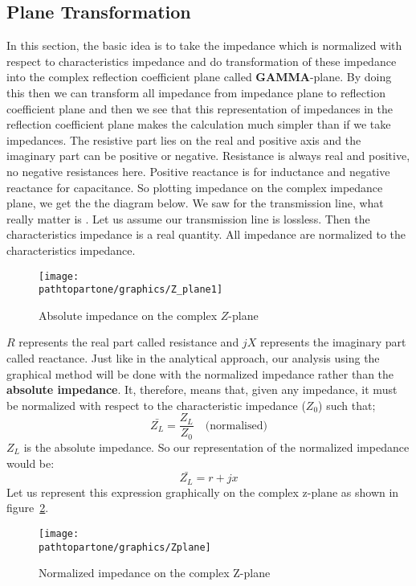 \subsection{Plane Transformation}
In this section, the basic idea is to take the impedance which is normalized with respect to characteristics impedance and do transformation of these impedance into the complex reflection coefficient plane called \textbf{GAMMA}-plane. By doing this then we can transform all impedance from impedance plane to reflection coefficient plane and then we see that this representation of impedances in the reflection coefficient plane makes the calculation much simpler than if we take impedances. The resistive part lies on the real and positive axis and the imaginary part can be positive or negative. Resistance is always real and positive, no negative resistances here. Positive reactance is for inductance and negative reactance for capacitance. So plotting impedance on the complex impedance plane, we get the the diagram below. We saw for the transmission line, what really matter is . Let us assume our transmission line is lossless. Then the characteristics impedance is a real quantity. All impedance are normalized to the characteristics impedance.
\begin{figure}[h]
\centering
{\texttt{[image: \\pathtopartone/graphics/Z\_plane1]}}
\caption{Absolute impedance on the complex $Z$-plane}
\label{fig:mjhdj}
\end{figure}

$R$ represents the real part called resistance and $jX$ represents the imaginary part called reactance. Just like in the analytical approach, our analysis using the graphical method will be done with the normalized impedance rather than the \textbf{absolute impedance}. It, therefore, means that, given any impedance, it must be normalized with respect to the characteristic impedance ($Z_0$) such that;
\begin{equation*}
\bar{Z_L}=\frac{Z_L}{Z_0} \quad \text{(normalised)}
\end{equation*}
$Z_L$ is the absolute impedance. So our representation of the normalized impedance would be:
\begin{equation*}
\bar{Z_L}= r + jx
\end{equation*}
Let us represent this expression graphically on the complex z-plane as shown in figure~\ref{fig:transline2}.
\begin{figure}[h]
\center\texttt{[image: \\pathtopartone/graphics/Zplane]}
\caption{Normalized impedance on the complex Z-plane}
\label{fig:transline2}
\end{figure}

